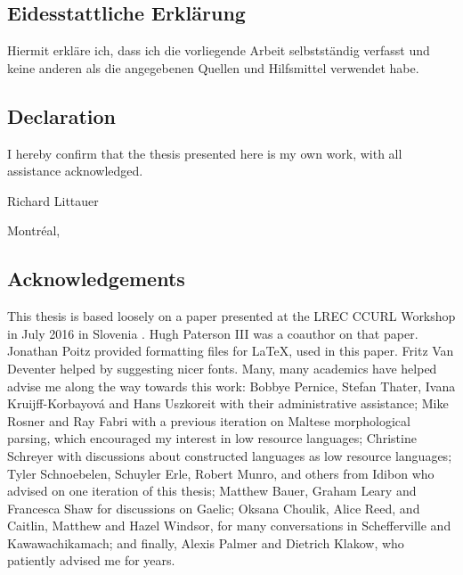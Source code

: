 \documentclass[12pt,a4paper]{article}
\begin{document}


\newpage

\thispagestyle{empty}
\noindent\subsection*{Eidesstattliche Erkl\"arung}

\noindent Hiermit erkl\"are ich, dass ich die vorliegende Arbeit selbstst\"andig verfasst und keine anderen als die angegebenen Quellen und Hilfsmittel verwendet habe.\\

\noindent\subsection*{Declaration}

\noindent I hereby confirm that the thesis presented here is my own work, with all assistance acknowledged. \\

\vspace{1cm}

\noindent Richard Littauer

\vspace{.5cm}

\noindent Montr\'eal, \thedate



\newpage

\thispagestyle{empty}
\noindent\subsection*{Acknowledgements}

This thesis is based loosely on a paper presented at the LREC CCURL Workshop in July 2016 in Slovenia \citep{CCURL}. Hugh Paterson III was a coauthor on that paper. Jonathan Poitz provided formatting files for \LaTeX, used in this paper. Fritz Van Deventer helped by suggesting nicer fonts. Many, many academics have helped advise me along the way towards this work: Bobbye Pernice, Stefan Thater, Ivana Kruijff-Korbayov\'a and Hans Uszkoreit with their administrative assistance; Mike Rosner and Ray Fabri with a previous iteration on Maltese morphological parsing, which encouraged my interest in low resource languages; Christine Schreyer with discussions about constructed languages as low resource languages; Tyler Schnoebelen, Schuyler Erle, Robert Munro, and others from Idibon who advised on one iteration of this thesis; Matthew Bauer, Graham Leary and Francesca Shaw for discussions on Gaelic; Oksana Choulik, Alice Reed, and Caitlin, Matthew and Hazel Windsor, for many conversations in Schefferville and Kawawachikamach; and finally, Alexis Palmer and Dietrich Klakow, who patiently advised me for years.
\end{document}
